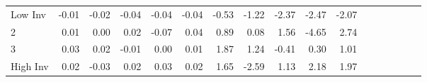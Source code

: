\begin{table}[!ht]
\begin{tabular}{lrrrrrrrrrrrrrrrr}
    \\
      \cmidrule(r){2-5} \cmidrule(r){6-9} \cmidrule(r){10-13} \cmidrule(r){14-17}

    Low Inv   & -0.01  & -0.02  & -0.04  & -0.04  & -0.04  & -0.53  & -1.22  & -2.37  & -2.47  & -2.07  \\
           2  & 0.01  & 0.00  & 0.02  & -0.07  & 0.04  & 0.89  & 0.08  & 1.56  & -4.65  & 2.74  \\
           3  & 0.03  & 0.02  & -0.01  & 0.00  & 0.01  & 1.87  & 1.24  & -0.41  & 0.30  & 1.01  \\
    High Inv  & 0.02  & -0.03  & 0.02  & 0.03  & 0.02  & 1.65  & -2.59  & 1.13  & 2.18  & 1.97  \\

  

  \bottomrule
\end{tabular}
\label{tbl:25_Size_BM_Inv_C1997}
\end{table}